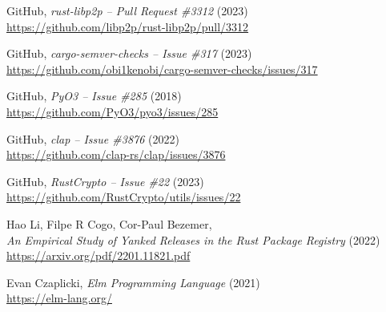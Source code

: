 \documentclass[licencjacka,en]{pracamgr}
\begin{document}
\begin{thebibliography}{99}








 GitHub,
	\textit{rust-libp2p -- Pull Request \#3312} (2023) \\
	\url{https://github.com/libp2p/rust-libp2p/pull/3312}



 GitHub,
	\textit{cargo-semver-checks -- Issue \#317} (2023) \\
	\url{https://github.com/obi1kenobi/cargo-semver-checks/issues/317}



 GitHub,
    \textit{PyO3 -- Issue \#285} (2018) \\
    \url{https://github.com/PyO3/pyo3/issues/285}

 GitHub,
    \textit{clap -- Issue \#3876} (2022) \\
    \url{https://github.com/clap-rs/clap/issues/3876}

 GitHub,
    \textit{RustCrypto -- Issue \#22} (2023) \\
    \url{https://github.com/RustCrypto/utils/issues/22}

 Hao Li, Filpe R Cogo, Cor-Paul Bezemer, \\
    \textit{An Empirical Study of Yanked Releases in the Rust Package Registry} (2022) \\
	\url{https://arxiv.org/pdf/2201.11821.pdf}



 Evan Czaplicki,
    \textit{Elm Programming Language} (2021) \\
    \url{https://elm-lang.org/}



\end{thebibliography}
\end{document}
